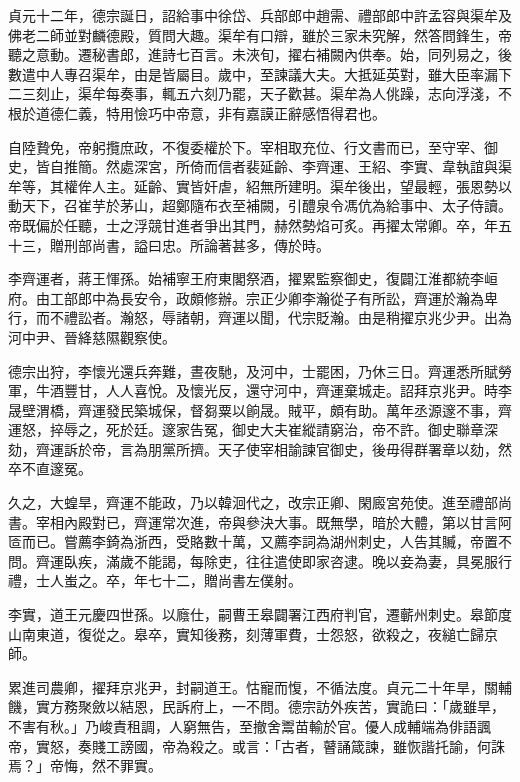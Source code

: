\begin{pinyinscope}
 貞元十二年，德宗誕日，詔給事中徐岱、兵部郎中趙需、禮部郎中許孟容與渠牟及佛老二師並對麟德殿，質問大趣。渠牟有口辯，雖於三家未究解，然答問鋒生，帝聽之意動。遷秘書郎，進詩七百言。未浹旬，擢右補闕內供奉。始，同列易之，後數遣中人專召渠牟，由是皆屬目。歲中，至諫議大夫。大抵延英對，雖大臣率漏下二三刻止，渠牟每奏事，輒五六刻乃罷，天子歡甚。渠牟為人佻躁，志向浮淺，不根於道德仁義，特用憸巧中帝意，非有嘉謨正辭感悟得君也。



 自陸贄免，帝躬攬庶政，不復委權於下。宰相取充位、行文書而已，至守宰、御史，皆自推簡。然處深宮，所倚而信者裴延齡、李齊運、王紹、李實、韋執誼與渠牟等，其權侔人主。延齡、實皆奸虐，紹無所建明。渠牟後出，望最輕，張恩勢以動天下，召崔芋於茅山，超鄭隨布衣至補闕，引醴泉令馮伉為給事中、太子侍讀。帝既偏於任聽，士之浮競甘進者爭出其門，赫然勢焰可炙。再擢太常卿。卒，年五十三，贈刑部尚書，謚曰忠。所論著甚多，傳於時。



 李齊運者，蔣王惲孫。始補寧王府東閣祭酒，擢累監察御史，復闢江淮都統李峘府。由工部郎中為長安令，政頗修辦。宗正少卿李瀚從子有所訟，齊運於瀚為卑行，而不禮訟者。瀚怒，辱諸朝，齊運以聞，代宗貶瀚。由是稍擢京兆少尹。出為河中尹、晉絳慈隰觀察使。



 德宗出狩，李懷光還兵奔難，晝夜馳，及河中，士罷困，乃休三日。齊運悉所賦勞軍，牛酒豐甘，人人喜悅。及懷光反，還守河中，齊運棄城走。詔拜京兆尹。時李晟壁渭橋，齊運發民築城保，督芻粟以餉晟。賊平，頗有助。萬年丞源邃不事，齊運怒，捽辱之，死於廷。邃家告冤，御史大夫崔縱請窮治，帝不許。御史聯章深劾，齊運訴於帝，言為朋黨所擠。天子使宰相諭諫官御史，後毋得群署章以劾，然卒不直邃冤。



 久之，大蝗旱，齊運不能政，乃以韓洄代之，改宗正卿、閑廄宮苑使。進至禮部尚書。宰相內殿對已，齊運常次進，帝與參決大事。既無學，暗於大體，第以甘言阿匼而已。嘗薦李錡為浙西，受賂數十萬，又薦李詞為湖州刺史，人告其贓，帝置不問。齊運臥疾，滿歲不能謁，每除吏，往往遣使即家咨逮。晚以妾為妻，具冕服行禮，士人蚩之。卒，年七十二，贈尚書左僕射。



 李實，道王元慶四世孫。以廕仕，嗣曹王皋闢署江西府判官，遷蘄州刺史。皋節度山南東道，復從之。皋卒，實知後務，刻薄軍費，士怨怒，欲殺之，夜縋亡歸京師。



 累進司農卿，擢拜京兆尹，封嗣道王。怙寵而愎，不循法度。貞元二十年旱，關輔饑，實方務聚斂以結恩，民訴府上，一不問。德宗訪外疾苦，實詭曰：「歲雖旱，不害有秋。」乃峻責租調，人窮無告，至撤舍鬻苗輸於官。優人成輔端為俳語諷帝，實怒，奏賤工謗國，帝為殺之。或言：「古者，瞽誦箴諫，雖恢諧托諭，何誅焉？」帝悔，然不罪實。




\end{pinyinscope}
